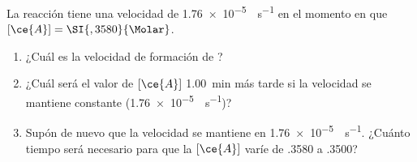 La reacción  tiene una velocidad de \SI{1,76e-5}{\Molar\per\second} en el momento en que $[\ce{A}] = \SI{,3580}{\Molar}$.
\begin{enumerate}[label={\alph*)},font={\color{red!50!black}\bfseries}]
	\item ¿Cuál es la velocidad de formación de ?
	\item ¿Cuál será el valor de $[\ce{A}]$ \SI{1,00}{\minute} más tarde si la velocidad se mantiene constante (\SI{1,76e-5}{\Molar\per\second})?
	\item Supón de nuevo que la velocidad se mantiene en \SI{1,76e-5}{\Molar\per\second}. ¿Cuánto tiempo será necesario para que la $[\ce{A}]$ varíe de \num{,3580} a \SI{,3500}{\Molar}?
\end{enumerate}
